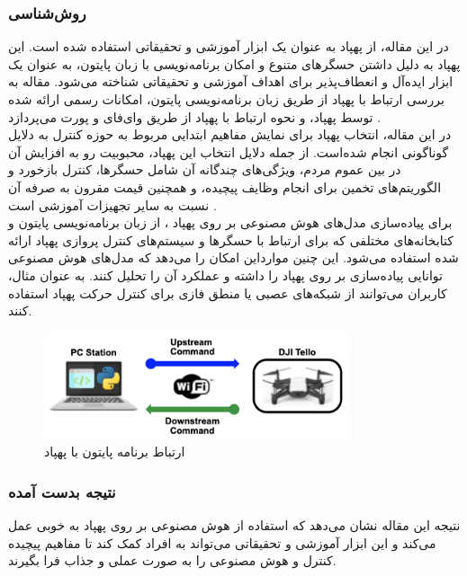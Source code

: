 \subsubsection{روش‌شناسی}
در این مقاله، از پهپاد  به عنوان یک ابزار آموزشی و تحقیقاتی استفاده شده است. این پهپاد به دلیل داشتن حسگرهای متنوع و امکان برنامه‌نویسی با زبان پایتون، به عنوان یک 
ابزار ایده‌آل و انعطاف‌پذیر برای اهداف آموزشی و تحقیقاتی شناخته می‌شود. مقاله به بررسی ارتباط با پهپاد  از طریق زبان برنامه‌نویسی پایتون، امکانات 
 رسمی ارائه شده توسط پهپاد، و نحوه ارتباط با پهپاد از طریق وای‌فای و پورت  می‌پردازد .
\\
در این مقاله، انتخاب پهپاد  برای نمایش مفاهیم ابتدایی مربوط به حوزه کنترل به دلایل گوناگونی انجام شده‌است. از جمله دلایل انتخاب این پهپاد، محبوبیت رو به افزایش آن در بین عموم مردم،
ویژگی‌های چندگانه آن شامل حسگرها، کنترل بازخورد و الگوریتم‌های تخمین برای انجام وظایف پیچیده، و همچنین قیمت مقرون به صرفه آن نسبت به سایر تجهیزات آموزشی است .
\\
برای پیاده‌سازی مدل‌های هوش مصنوعی بر روی پهپاد ، از زبان برنامه‌نویسی پایتون و کتابخانه‌های مختلفی که برای ارتباط با حسگرها و سیستم‌های کنترل پروازی پهپاد ارائه شده استفاده می‌شود. این ‌چنین موارداین 
امکان را می‌دهد که مدل‌های هوش مصنوعی توانایی پیاده‌سازی بر روی پهپاد را داشته و عملکرد آن‌ را تحلیل کنند. به عنوان مثال، کاربران می‌توانند از شبکه‌های عصبی یا منطق فازی برای کنترل حرکت پهپاد استفاده کنند.

\begin{figure}[h]
    \centering
    \includegraphics[width=0.8\textwidth]{tello.png}
    \caption{ارتباط برنامه پایتون با پهپاد }
\end{figure}

\subsubsection{نتیجه بدست آمده}
نتیجه این مقاله نشان می‌دهد که استفاده از هوش مصنوعی بر روی پهپاد  به خوبی عمل می‌کند و این ابزار آموزشی و تحقیقاتی می‌تواند به افراد کمک کند تا مفاهیم پیچیده کنترل و هوش مصنوعی را به صورت عملی و جذاب فرا بگیرند. 


